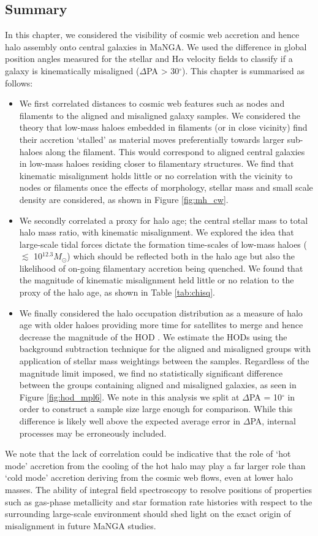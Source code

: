 \subsection{Summary}
In this chapter, we considered the visibility of cosmic web accretion and hence halo assembly onto central galaxies in MaNGA. We used the difference in global position angles measured for the stellar and H$\alpha$ velocity fields to classify if a galaxy is kinematically misaligned ($\Delta$PA > 30$^{\circ}$). This chapter is summarised as follows:
\begin{itemize}
\item We first correlated distances to cosmic web features such as nodes and filaments to the aligned and misaligned galaxy samples. We considered the theory that low-mass haloes embedded in filaments (or in close vicinity) find their accretion `stalled' as material moves preferentially towards larger sub-haloes along the filament. This would correspond to aligned central galaxies in low-mass haloes residing closer to filamentary structures. We find that kinematic misalignment holds little or no correlation with the vicinity to nodes or filaments once the effects of morphology, stellar mass and small scale density are considered, as shown in Figure \ref{fig:mh_cw}. 
\item We secondly correlated a proxy for halo age; the central stellar mass to total halo mass ratio, with kinematic misalignment. We explored the idea that large-scale tidal forces dictate the formation time-scales of low-mass haloes ($\lesssim$ 10$^{12.3} M_{\odot}$) which should be reflected both in the halo age but also the likelihood of on-going filamentary accretion being quenched. We found that the magnitude of kinematic misalignment held little or no relation to the proxy of the halo age, as shown in Table \ref{tab:chisq}. 
\item We finally considered the halo occupation distribution as a measure of halo age with older haloes providing more time for satellites to merge and hence decrease the magnitude of the HOD \citep[e.g.][]{zehavi2018}. We estimate the HODs using the background subtraction technique for the aligned and misaligned groups with application of stellar mass weightings between the samples. Regardless of the magnitude limit imposed, we find no statistically significant difference between the groups containing aligned and misaligned galaxies, as seen in Figure \ref{fig:hod_mpl6}. We note in this analysis we split at $\Delta$PA = 10$^{\circ}$ in order to construct a sample size large enough for comparison. While this difference is likely well above the expected average error in $\Delta$PA, internal processes may be erroneously included.
\end{itemize}

We note that the lack of correlation could be indicative that the role of `hot mode' accretion from the cooling of the hot halo may play a far larger role than `cold mode' accretion deriving from the cosmic web flows, even at lower halo masses. The ability of integral field spectroscopy to resolve positions of properties such as gas-phase metallicity and star formation rate histories with respect to the surrounding large-scale environment should shed light on the exact origin of misalignment in future MaNGA studies.